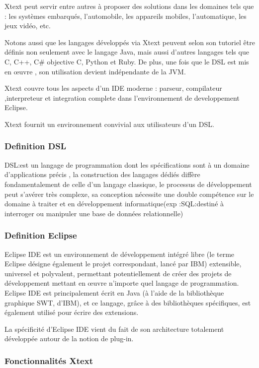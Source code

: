\documentclass{article}
\begin{document}
Xtext peut servir entre autres à proposer des solutions dans les domaines tels que : les systèmes embarqués, l'automobile, les appareils mobiles, l'automatique, les jeux vidéo, etc.

Notons aussi que les langages développés via Xtext peuvent selon son tutoriel être définis non seulement avec le langage Java, mais aussi d'autres langages tels que C, C++, C\# objective C, Python et Ruby. De plus, une fois que le DSL est mis en œuvre , son utilisation devient indépendante de la JVM. 

Xtext couvre tous les aspects d’un IDE moderne : parseur, compilateur ,interpreteur et integration complete dans l’environnement de developpement Eclipse.

Xtext fournit un environnement convivial aux utilisateurs d’un DSL.

\subsubsection{Definition DSL}
DSL:est un langage de programmation dont les spécifications sont à un domaine d’applications précis , la construction des langages dédiés diffère fondamentalement de celle d’un langage classique, le processus de développement  peut s'avérer très complexe, sa conception nécessite une double compétence sur le domaine à traiter et en développement informatique(exp :SQL:destiné à interroger ou manipuler une base de données relationnelle)

\subsubsection{Definition Eclipse}
Eclipse IDE est un environnement de développement intégré libre (le terme Eclipse désigne également le projet correspondant, lancé par IBM) extensible, universel et polyvalent, permettant potentiellement de créer des projets de développement mettant en œuvre n'importe quel langage de programmation. Eclipse IDE est principalement écrit en Java (à l'aide de la bibliothèque graphique SWT, d'IBM), et ce langage, grâce à des bibliothèques spécifiques, est également utilisé pour écrire des extensions.

La spécificité d'Eclipse IDE vient du fait de son architecture totalement développée autour de la notion de plug-in.


\subsubsection{Fonctionnalités Xtext}
\end{document}
